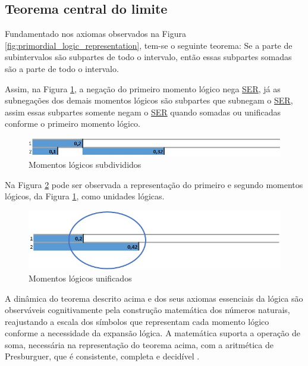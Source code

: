 \subsection{Teorema central do limite}
Fundamentado nos axiomas observados na Figura \ref{fig:primordial_logic_representation}, tem-se o seguinte teorema: Se a parte de subintervalos são subpartes de todo o intervalo, então essas subpartes somadas são a parte de todo o intervalo.

Assim, na Figura \ref{fig:second_logical_moment}, a negação do primeiro momento lógico nega \underline{SER}, já as subnegações dos demais momentos lógicos são subpartes que subnegam o \underline{SER}, assim essas subpartes somente negam o \underline{SER} quando somadas ou unificadas conforme o primeiro momento lógico.
	\begin{figure}[H]
	\caption{Momentos lógicos subdivididos}
	\label{fig:second_logical_moment}
	\centering
	\includegraphics[scale=.8]{sections/images/second_logical_moment.jpg}
	\end{figure}

Na Figura \ref{fig:logical_units} pode ser observada a representação do primeiro e segundo momentos lógicos, da Figura \ref{fig:second_logical_moment}, como unidades lógicas.
	\begin{figure}[H]
	\caption{Momentos lógicos unificados}
	\label{fig:logical_units}
	\centering
	\includegraphics[scale=.8]{sections/images/logical_units.jpg}
	\end{figure}

A dinâmica do teorema descrito acima e dos seus axiomas essenciais da lógica são observáveis cognitivamente pela construção matemática dos números naturais, reajustando a escala dos símbolos que representam cada momento lógico conforme a necessidade da expansão lógica. A matemática suporta a operação de soma, necessária na representação do teorema acima, com a aritmética de Presburguer, que é consistente, completa e decidível \cite{wiki_arithmetic_presburger}.

